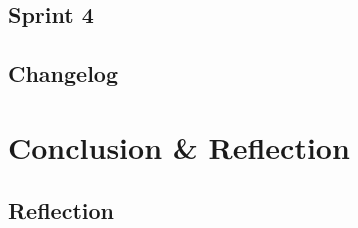 \documentclass[12pt]{report}
\begin{document}
	

	

	

\chapter{Sprint 4}

\chapter{Changelog}

\part{Conclusion \& Reflection}

\chapter{Reflection}

\printglossaries
{}
\end{document}

